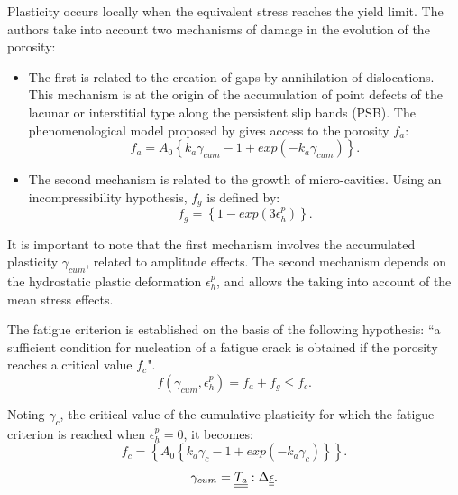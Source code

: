 Plasticity occurs locally when the equivalent stress reaches the yield limit. The authors take into account two mechanisms of damage in the evolution of the porosity:

\vspace{6pt}
\begin{itemize}
	\item  The first is related to the creation of gaps by annihilation of dislocations. This mechanism is at the origin of the accumulation of point defects of the lacunar or interstitial type along the persistent slip bands (PSB). The phenomenological model proposed by \cite{essmann1979annihilation} gives access to the porosity $f_a$:
	\begin{equation}
	f_a= A_0\left\lbrace k_a\gamma_{cum}-1+exp\left(-k_a\gamma_{cum} \right)  \right\rbrace .
	\label{eq.monchiet2}
	\end{equation}
	
	\item  The second mechanism is related to the growth of micro-cavities. Using an incompressibility hypothesis, $f_g$ is defined by:
	\begin{equation}
	f_g=\left\lbrace 1-exp\left(3\epsilon_h^p \right) \right\rbrace.
	\label{eq.monchiet3}
	\end{equation}
\end{itemize}

It is important to note that the first mechanism involves the accumulated plasticity $\gamma_{cum}$, related to amplitude effects. The second mechanism depends on the hydrostatic plastic deformation $\epsilon_h^p$, and allows the taking into account of the mean stress effects.

The fatigue criterion is established on the basis of the following hypothesis: ``a sufficient condition for nucleation of a fatigue crack is obtained if the porosity reaches a critical value $f_c$".
\begin{equation}
f\left( \gamma_{cum},\epsilon_h^p\right) =f_a+f_g\leqslant f_c.
\label{eq.monchiet4}
\end{equation}

Noting $\gamma_c$, the critical value of the cumulative plasticity for which the fatigue criterion is reached when $\epsilon_h^p=0$, it becomes:
\begin{equation}
f_c=\left\lbrace A_0\left\lbrace k_a\gamma_{c}-1+exp\left(-k_a\gamma_{c} \right)  \right\rbrace \right\rbrace.
\label{eq.monchiet5}
\end{equation}
\begin{equation}
\gamma_{cum}=\uline{\uline{T_a}}:\Delta\uline{\uline{\epsilon}}.
\label{eq.monchiet5.5}
\end{equation}

